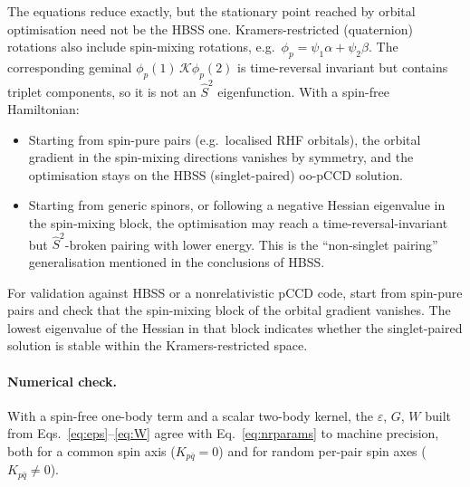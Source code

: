 \documentclass[11pt,a4paper]{article}
\newcommand{\kb}[1]{\bar{#1}}                 %
\begin{document}
The equations reduce exactly, but the stationary point reached by orbital optimisation need not be
the HBSS one. Kramers-restricted (quaternion) rotations also include spin-mixing rotations, e.g.\
$\phi_p=\psi_1\alpha+\psi_2\beta$. The corresponding geminal $\phi_p(1)\,\mathcal K\phi_p(2)$ is
time-reversal invariant but contains triplet components, so it is not an $\hat S^2$ eigenfunction.
With a spin-free Hamiltonian:
\begin{itemize}
\item Starting from spin-pure pairs (e.g.\ localised RHF orbitals), the orbital gradient in the
  spin-mixing directions vanishes by symmetry, and the optimisation stays on the HBSS
  (singlet-paired) oo-pCCD solution.
\item Starting from generic spinors, or following a negative Hessian eigenvalue in the spin-mixing
  block, the optimisation may reach a time-reversal-invariant but $\hat S^2$-broken pairing with lower
  energy. This is the ``non-singlet pairing'' generalisation mentioned in the conclusions of HBSS.
\end{itemize}
For validation against HBSS or a nonrelativistic pCCD code, start from spin-pure pairs and check that
the spin-mixing block of the orbital gradient vanishes. The lowest eigenvalue of the Hessian in that
block indicates whether the singlet-paired solution is stable within the Kramers-restricted space.

\paragraph{Numerical check.} With a spin-free one-body term and a scalar two-body kernel, the
$\varepsilon$, $G$, $W$ built from Eqs.~\eqref{eq:eps}--\eqref{eq:W} agree with
Eq.~\eqref{eq:nrparams} to machine precision, both for a common spin axis ($K_{p\kb q}=0$) and for
random per-pair spin axes ($K_{p\kb q}\neq0$).
\end{document}
